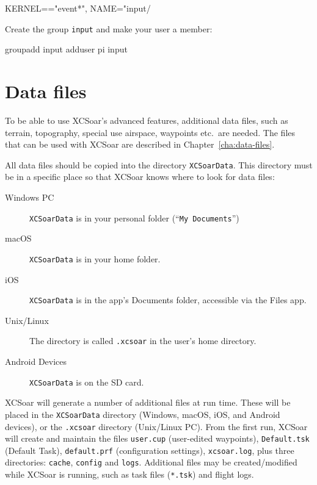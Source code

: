 \begin{verbatim*}
KERNEL=="event*", NAME="input/%
\end{verbatim*}

Create the group \texttt{input} and make your user a member:

\begin{verbatim*}
groupadd input
adduser pi input
\end{verbatim*}

\section{Data files}\label{sec:data files}

To be able to use XCSoar's advanced features, additional data files, such as
terrain, topography, special use airspace, waypoints etc.\ are needed. The files
that can be used with XCSoar are described in Chapter~\ref{cha:data-files}.

All data files should be copied into the directory
\texttt{XCSoarData}.  This directory must be in a specific place
so that XCSoar knows where to look for data files:

\begin{description}
\item[Windows PC]
\texttt{XCSoarData} is in your personal folder (``\texttt{My
Documents}'')
\item[macOS]
\texttt{XCSoarData} is in your home folder.
\item[iOS]
\texttt{XCSoarData} is in the app's Documents folder, accessible via
the Files app.
\item[Unix/Linux]
The directory is called \verb|.xcsoar| in the user's home directory.
\item[Android Devices]
\texttt{XCSoarData} is on the SD card.
\end{description}


XCSoar will generate a number of additional files at run time.  These
will be placed in the  \texttt{XCSoarData} directory (Windows, macOS,
iOS, and Android devices), or the \texttt{.xcsoar} directory (Unix/Linux
PC).  From the first run, XCSoar will create and maintain the files
\texttt{user.cup} (user-edited waypoints),
\texttt{Default.tsk} (Default Task),  
\texttt{default.prf} 
(configuration settings),
\texttt{xcsoar.log}, 
plus three directories: \texttt{cache},
\texttt{config} and \texttt{logs}.  Additional files may be
created/modified while XCSoar is running, such as task files
(\texttt{*.tsk}) and flight logs.


